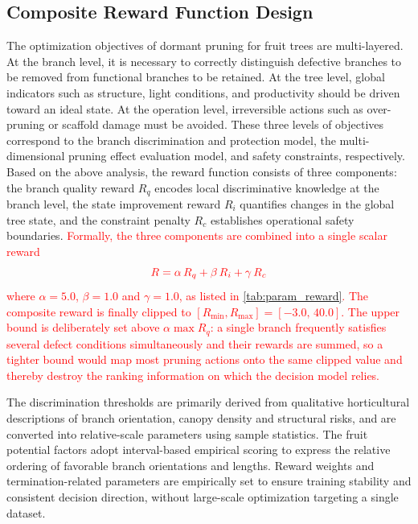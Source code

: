 \documentclass[12pt,a4paper,fontset=fandol]{ctexart}
\newcommand{\rev}[1]{\textcolor{red}{#1}}
\begin{document}
\subsection{Composite Reward Function Design}\label{sec:formalization:reward}

The optimization objectives of dormant pruning for fruit trees are multi-layered. At the branch level, it is necessary to correctly distinguish defective branches to be removed from functional branches to be retained. At the tree level, global indicators such as structure, light conditions, and productivity should be driven toward an ideal state. At the operation level, irreversible actions such as over-pruning or scaffold damage must be avoided. These three levels of objectives correspond to the branch discrimination and protection model, the multi-dimensional pruning effect evaluation model, and safety constraints, respectively. Based on the above analysis, the reward function consists of three components:
the branch quality reward $R_q$  encodes local discriminative knowledge at the branch level,
the state improvement reward $R_i$ quantifies changes in the global tree state, and the constraint penalty $R_c$  establishes operational safety boundaries.
\rev{Formally, the three components are combined into a single scalar reward}
\begin{equation}\label{eq:reward_total}
  \rev{R = \alpha \, R_q + \beta \, R_i + \gamma \, R_c}
\end{equation}
\rev{where $\alpha = 5.0$, $\beta = 1.0$ and $\gamma = 1.0$, as listed in \cref{tab:param_reward}. The composite reward is finally clipped to $[R_{\min}, R_{\max}] = [-3.0,\, 40.0]$. The upper bound is deliberately set above $\alpha \max R_q$: a single branch frequently satisfies several defect conditions simultaneously and their rewards are summed, so a tighter bound would map most pruning actions onto the same clipped value and thereby destroy the ranking information on which the decision model relies.}

The discrimination thresholds are primarily derived from qualitative horticultural descriptions of branch orientation, canopy density and structural risks, and are converted into relative-scale parameters using sample statistics. The fruit potential factors adopt interval-based empirical scoring to express the relative ordering of favorable branch orientations and lengths. Reward weights and termination-related parameters are empirically set to ensure training stability and consistent decision direction, without large-scale optimization targeting a single dataset. 
\end{document}

